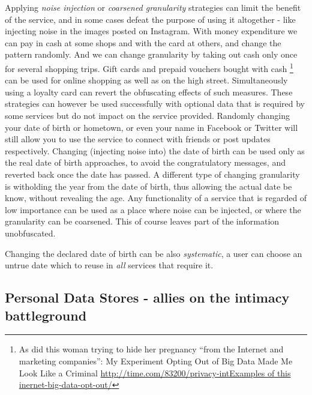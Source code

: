 \documentclass{IOS-Book-Article}     %
\begin{document}
Applying \emph{noise injection} or \emph{coarsened granularity} strategies can 
limit the benefit of the service, and in some cases defeat the purpose of 
using it altogether - like injecting noise in the images posted on Instagram.
With money expenditure we can pay in cash at some shops and with the card at 
others, and change the pattern randomly. And we can change granularity by 
taking out cash only once for several shopping trips. Gift cards 
and prepaid vouchers bought with cash 
\footnote{As did this woman trying to hide her pregnancy ``from the Internet 
and marketing companies'': My Experiment Opting Out of Big Data Made Me Look 
Like a Criminal \url{http://time.com/83200/privacy-intExamples of this 
inernet-big-data-opt-out/}} can be used for online shopping as well as on the 
high street. Simultaneously using a loyalty card can revert the obfuscating 
effects of such measures. 
These strategies can however be used successfully with optional data that 
is required by some services but do not impact on the service provided. 
Randomly changing your date of birth or hometown, or even your name in Facebook 
or Twitter will still allow you to use the service to connect with friends or 
post updates respectively. Changing (injecting noise into) the date of birth 
can be used only as the real date of birth approaches, to avoid the 
congratulatory messages, and reverted back once the date has passed. A 
different type of changing granularity is witholding the year from the 
date of birth, thus allowing the actual date be know, without revealing the 
age. Any functionality of a service that is regarded of low importance can be 
used as a place where noise can be injected, or where the granularity can be 
coarsened. This of course leaves part of the information unobfuscated. 

Changing the declared date of birth can be also \emph{systematic}, a user can 
choose an untrue date which to reuse in \emph{all} services that require it.


\subsection{Personal Data Stores - allies on the intimacy battleground}
\end{document}
